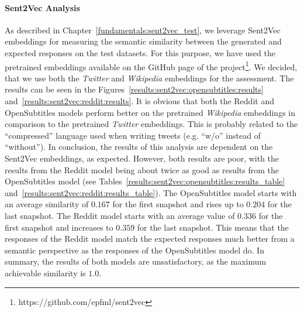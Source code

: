 \paragraph{Sent2Vec Analysis} As described in Chapter~\ref{fundamentals:sent2vec_test}, we leverage Sent2Vec embeddings for measuring the semantic similarity between the generated and expected responses on the test datasets. For this purpose, we have used the pretrained embeddings available on the GitHub page of the project\footnote{https://github.com/epfml/sent2vec}. We decided, that we use both the \emph{Twitter} and \emph{Wikipedia} embeddings for the assessment. The results can be seen in the Figures~\ref{results:sent2vec:opensubtitles:results} and~\ref{results:sent2vec:reddit:results}. It is obvious that both the Reddit and OpenSubtitles models perform better on the pretrained \emph{Wikipedia} embeddings in comparison to the pretrained \emph{Twitter} embeddings. This is probably related to the ``compressed'' language used when writing tweets (e.g. ``w/o'' instead of ``without''). In conclusion, the results of this analysis are dependent on the Sent2Vec embeddings, as expected. However, both results are poor, with the results from the Reddit model being about twice as good as results from the OpenSubtitles model (see Tables~\ref{results:sent2vec:opensubtitles:results_table} and~\ref{results:sent2vec:reddit:results_table}). The OpenSubtitles model starts with an average similarity of $0.167$ for the first snapshot and rises up to $0.204$ for the last snapshot. The Reddit model starts with an average value of $0.336$ for the first snapshot and increases to $0.359$ for the last snapshot. This means that the responses of the Reddit model match the expected responses much better from a semantic perspective as the responses of the OpenSubtitles model do. In summary, the results of both models are unsatisfactory, as the maximum achievable similarity is $1.0$.

